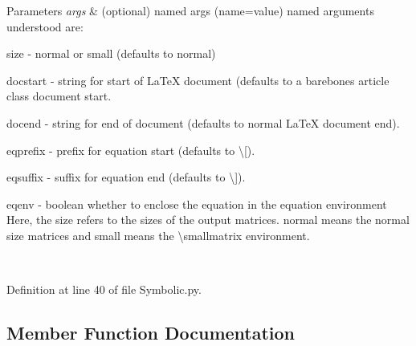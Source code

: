 \begin{DoxyParams}{Parameters}
{\em args} & (optional) named args (name=value) named arguments understood are\+:
\begin{DoxyItemize}
\item \textquotesingle{}size\textquotesingle{} -\/ \textquotesingle{}normal\textquotesingle{} or \textquotesingle{}small\textquotesingle{} (defaults to \textquotesingle{}normal\textquotesingle{})
\item \textquotesingle{}docstart\textquotesingle{} -\/ string for start of La\+TeX document (defaults to a barebones article class document start.
\item \textquotesingle{}docend\textquotesingle{} -\/ string for end of document (defaults to normal La\+TeX document end).
\item \textquotesingle{}eqprefix\textquotesingle{} -\/ prefix for equation start (defaults to \textbackslash{}\mbox{[}).
\item \textquotesingle{}eqsuffix\textquotesingle{} -\/ suffix for equation end (defaults to \textbackslash{}\mbox{]}).
\item \textquotesingle{}eqenv\textquotesingle{} -\/ boolean whether to enclose the equation in the equation environment Here, the size refers to the sizes of the output matrices. \textquotesingle{}normal\textquotesingle{} means the normal size matrices and \textquotesingle{}small\textquotesingle{} means the \textbackslash{}smallmatrix environment. 
\end{DoxyItemize}\\
\hline
\end{DoxyParams}


Definition at line 40 of file Symbolic.\+py.



\subsection{Member Function Documentation}
\mbox{\label{classSignalIntegrity_1_1SystemDescriptions_1_1Symbolic_1_1Symbolic_a26d16e796dfe67359239b0e44e7f6536}} 

